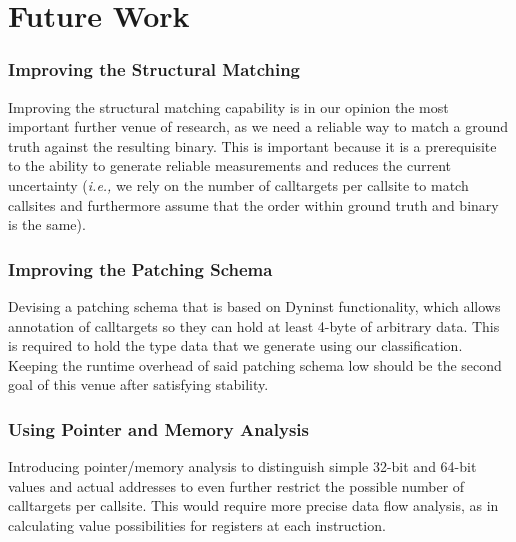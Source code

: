 \section{Future Work}
\label{chapter:Future_Work}

\subsubsection{Improving the Structural Matching} 
Improving the structural matching capability is in our opinion the most 
important further venue of research, as we need a reliable way to 
match a ground truth against the resulting binary. This is important 
because it is a prerequisite to the ability to generate reliable 
measurements and reduces the current uncertainty (\textit{i.e.,} we rely on the 
number of calltargets per callsite to match callsites and furthermore
assume that the order within ground truth and binary is the same).

\subsubsection{Improving the Patching Schema} 
Devising a patching schema
that is based on Dyninst functionality, 
which allows annotation of calltargets so they can hold at least 
4-byte of arbitrary data. This is required to hold the type data that
we generate using our classification. Keeping the runtime overhead
of said patching schema low should be the second goal of this venue 
after satisfying stability.


\subsubsection{Using Pointer and Memory Analysis} 
Introducing pointer/memory analysis
to distinguish simple 32-bit and 64-bit values and actual addresses to even further restrict the 
possible number of calltargets per callsite. This would require more 
precise data flow analysis, as in calculating value possibilities for 
registers at each instruction.

